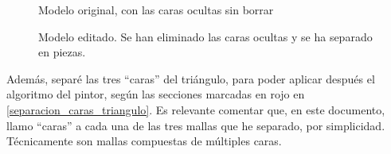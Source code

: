 \documentclass[a4paper,12pt]{article}
\begin{document}
\begin{figure}[h]
    \centering
    \caption{Modelo original, con las caras ocultas sin borrar} \label{caras_ocultas_sin_borrar}
\end{figure}
\begin{figure}[h]
    \centering
    \caption{Modelo editado. Se han eliminado las caras ocultas y se ha separado en piezas.} \label{caras_ocultas_borradas}
\end{figure}

Además, separé las tres ``caras'' del triángulo, para poder aplicar después el algoritmo del pintor, según las secciones marcadas en rojo en \ref{separacion_caras_triangulo}. Es relevante comentar que, en este documento, llamo ``caras'' a cada una de las tres mallas que he separado, por simplicidad. Técnicamente son mallas compuestas de múltiples caras.
\end{document}
